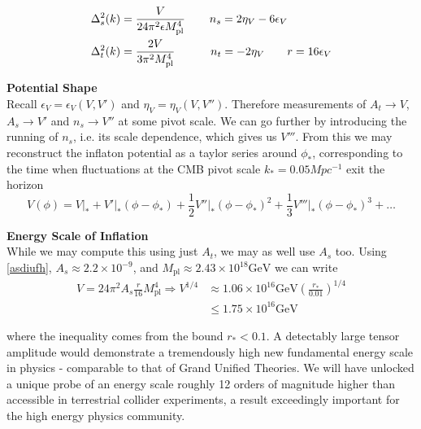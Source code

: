 \documentclass[a4paper,10pt]{article}
\newcommand{\Mp}{M_{\text{pl}}}
\newcommand{\half}{\frac{1}{2}}
\begin{document}
\begin{equation}
\begin{split}
\Delta^2_s(k) &= \frac{V}{24\pi^2\epsilon\Mp^4} \hspace{4mm}\quad n_s=2\eta_V-6\epsilon_V\\
\Delta^2_t(k) &= \frac{2V}{3\pi^2\Mp^4}  \hspace{4mm}\qquad n_t=-2\eta_V \qquad r=16\epsilon_V
\end{split}
\label{asdiufh}
\end{equation}


\textbf{Potential Shape}\\

Recall $\epsilon_V=\epsilon_V(V,V')$ and $\eta_V=\eta_V(V,V'')$. Therefore measurements of $A_t\rightarrow V$, $A_s\rightarrow V'$ and $n_s\rightarrow V''$ at some pivot scale. We can go further by introducing the running of $n_s$, i.e. its scale dependence, which gives us $V'''$. From this we may reconstruct the inflaton potential as a taylor series around $\phi_*$, corresponding to the time when fluctuations at the CMB pivot scale $k_* = 0.05Mpc^{-1}$ exit the horizon
\begin{equation}
V(\phi) = V\rvert_{*}+V'\rvert_{*}(\phi-\phi_*)+\half V''\rvert_{*}(\phi-\phi_*)^2+\frac{1}{3}V'''\rvert_{*}(\phi-\phi_*)^3 + \ldots
\end{equation}

\textbf{Energy Scale of Inflation} \\

While we may compute this using just $A_t$, we may as well use $A_s$ too. Using \ref{asdiufh}, $A_s \approx 2.2\times10^{-9}$, and $\Mp \approx 2.43\times 10^{18} \text{GeV}$ we can write
\begin{equation}\begin{split}
V=24\pi^2A_s\frac{r}{16}\Mp^4 \Rightarrow V^{1/4} &\approx  1.06\times10^{16}\text{GeV}(\frac{r_*}{0.01})^{1/4} \\
&\leq 1.75\times10^{16}\text{GeV}
\end{split}\end{equation}

where the inequality comes from the bound $r_*<0.1$. A detectably large tensor amplitude would demonstrate a tremendously high new fundamental energy scale in physics - comparable to that of Grand Unified Theories. We will have unlocked a unique probe of an energy scale roughly 12 orders of magnitude higher than accessible in terrestrial collider experiments, a result exceedingly important for the high energy physics community.  \\
\end{document}
